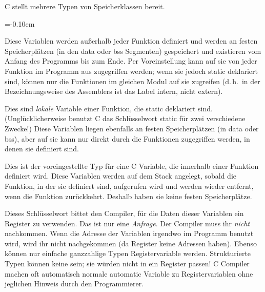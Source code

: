 C stellt mehrere Typen von Speicherklassen bereit.
\begin{description}
\parskip=-0.10em %

\item[global]
 Diese Variablen werden au{\ss}erhalb
jeder Funktion definiert und werden an festen Speicherpl\"{a}tzen (in
den {\code data} oder {\code bss} Segmenten) gespeichert und
existieren vom Anfang des Programms bis zum Ende. Per Voreinstellung
kann auf sie von jeder Funktion im Programm aus zugegriffen werden;
wenn sie jedoch {\code static} deklariert sind, k\"{o}nnen nur die
Funktionen im gleichen Modul auf sie zugreifen (d.\,h.\ in der
Bezeichnungsweise des Assemblers ist das Label intern, nicht
extern).

\item[static]
 Dies sind \emph{lokale} Variable
einer Funktion, die {\code static} deklariert sind.
(Ungl\"{u}cklicherweise benutzt C das Schl\"{u}sselwort {\code static} f\"{u}r
zwei verschiedene Zwecke!) Diese Variablen liegen ebenfalls an
festen Speicherpl\"{a}tzen (in {\code data} oder {\code bss}), aber auf
sie kann nur direkt durch die Funktionen zugegriffen werden, in
denen sie definiert sind.

\item[automatic]
 Dies ist der voreingestellte Typ
f\"{u}r eine C Variable, die innerhalb einer Funktion definiert wird.
Diese Variablen werden auf dem Stack angelegt, sobald die Funktion,
in der sie definiert sind, aufgerufen wird und werden wieder
entfernt, wenn die Funktion zur\"{u}ckkehrt. Deshalb haben sie keine
festen Speicherpl\"{a}tze.

\item[register]
 Dieses Schl\"{u}sselwort bittet den
Compiler, f\"{u}r die Daten dieser Variab\-len ein Register zu
verwenden. Das ist nur eine \emph{Anfrage}. Der Compiler muss ihr
\emph{nicht} nachkommen. Wenn die Adresse der Variablen irgendwo im
Programm benutzt wird, wird ihr nicht nachgekommen (da Register
keine Adressen haben). Ebenso k\"{o}nnen nur einfache ganzzahlige Typen
Registervariable werden. Strukturierte Typen k\"{o}nnen keine sein; sie
w\"{u}rden nicht in ein Register passen! C Compiler machen oft
automatisch normale {\code automatic} Variable zu Registervariablen
ohne jeglichen Hinweis durch den Programmierer.


\end{description}
